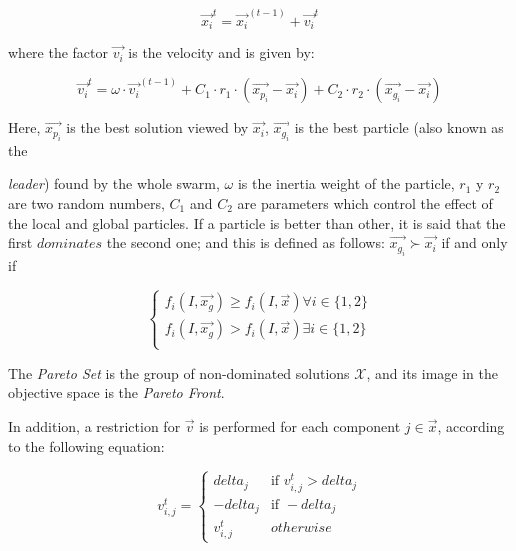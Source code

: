 \documentclass[spanish,twocolumn]{article}
\begin{document}
\begin{equation}\label{eq:psobasico}
\overrightarrow{x_i}^t = \overrightarrow{x_i}^{(t-1)} + \overrightarrow{v_i}^t
\end{equation}

where the factor $\overrightarrow{v_i}$ is the velocity and is given by:


\begin{equation}\label{eq:psobasico2}
\overrightarrow{v_i}^t = \omega \cdot \overrightarrow{v_i}^{(t-1)} + C_1 \cdot r_1 \cdot (\overrightarrow{x_{p_i}}-\overrightarrow{x_i}) + C_2 \cdot r_2 \cdot (\overrightarrow{x_{g_i}}-\overrightarrow{x_i})
\end{equation}

Here, $\overrightarrow{x_{p_i}}$ is the best solution viewed by $\overrightarrow{x_i}$, $\overrightarrow{x_{g_i}}$ is the best particle (also known as the {{\it leader}) found by the whole swarm, $\omega$ is the inertia weight of the particle, $r_1$ y $r_2$ are two random numbers, $C_1$ and $C_2$ are parameters which control the effect of the local and global particles. If a particle is better than other, it is said that the first $dominates$ the second one; and this is defined as follows: $\overrightarrow{x_{g_i}} \succ \overrightarrow{x_i}$ if and only if

\begin{equation}\label{eq:dominanciapareto}
         \begin{cases}  f_i(I,\overrightarrow{x_{g}})  \geq f_i(I,\overrightarrow{x}) \forall i \in \{1,2\} \\
                        f_i(I,\overrightarrow{x_{g}}) > f_i(I,\overrightarrow{x}) \exists i \in \{1,2\} \\
         \end{cases}
\end{equation}

The {\it Pareto Set} is the group of non-dominated solutions $\mathscr{X}$, and its image in the objective space is the  {\it Pareto Front}.

In addition, a restriction for $\overrightarrow{v}$ is performed for each component $j \in \overrightarrow{x}$, according to the following equation:
               
\begin{equation}\label{eq:restricciondelta}
    v_{i,j}^t = \begin{cases}  delta_j &\mbox{if } v_{i,j}^t > delta_j \\
                                -delta_j & \mbox{if } -delta_j \\
                                v_{i,j}^t & otherwise \end{cases}
\end{equation}

}
\end{document}

